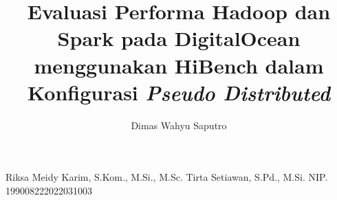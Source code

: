 \title{Evaluasi Performa Hadoop dan Spark pada DigitalOcean menggunakan HiBench dalam Konfigurasi \textit{Pseudo Distributed}} 	%
\author{Dimas Wahyu Saputro}		%
\dosbingB%
    {Riksa Meidy Karim, S.Kom., M.Si., M.Sc.}%
    {}				%
\dosbingA%
    {Tirta Setiawan, S.Pd., M.Si.}%
    {NIP. 199008222022031003}				%

\setcounter{page}{0}











\tableofcontents
{}
{%
    \let\oldnumberline\numberline%
    \renewcommand{\numberline}{\figurename~\oldnumberline}%
    \listoffigures%
}
{%
    \let\oldnumberline\numberline%
    \renewcommand{\numberline}{\tablename~\oldnumberline}%
    \listoftables%
}


\cleardoublepage


%